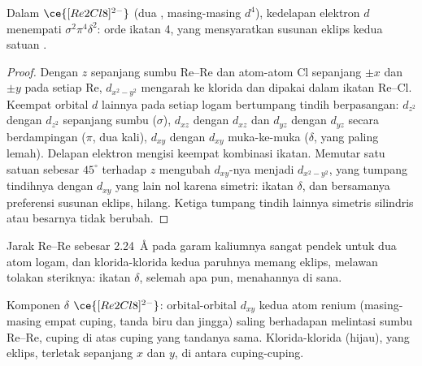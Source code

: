 \begin{proposition}\label{prop:b3:organometallic-bonding:quadruple}
Dalam $\ce{[Re2Cl8]^{2-}}$ (dua , masing-masing $d^4$), kedelapan elektron $d$ menempati $\sigma^2\pi^4\delta^2$: orde
ikatan 4, yang mensyaratkan susunan eklips kedua satuan .
\end{proposition}

\begin{proof}
Dengan $z$ sepanjang sumbu Re--Re dan atom-atom Cl sepanjang $\pm x$ dan $\pm y$ pada setiap Re, $d_{x^2-y^2}$
mengarah ke klorida dan dipakai dalam ikatan Re--Cl. Keempat orbital $d$ lainnya
pada setiap logam bertumpang tindih berpasangan: $d_{z^2}$ dengan $d_{z^2}$ sepanjang sumbu ($\sigma$), $d_{xz}$ dengan $d_{xz}$ dan $d_{yz}$
dengan $d_{yz}$ secara berdampingan ($\pi$, dua kali), $d_{xy}$ dengan $d_{xy}$ muka-ke-muka ($\delta$, yang paling lemah).
Delapan elektron mengisi keempat kombinasi ikatan. Memutar satu satuan sebesar $45^\circ$
terhadap $z$ mengubah $d_{xy}$-nya menjadi $d_{x^2-y^2}$, yang tumpang tindihnya dengan $d_{xy}$ yang lain nol karena
simetri: ikatan $\delta$, dan bersamanya preferensi susunan eklips, hilang. Ketiga
tumpang tindih lainnya simetris silindris atau besarnya tidak berubah.
\end{proof}

Jarak Re--Re sebesar \qty{2.24}{\angstrom} pada garam kaliumnya sangat pendek untuk dua atom logam, dan klorida-klorida kedua paruhnya memang eklips, melawan
tolakan steriknya: ikatan $\delta$, selemah apa pun, menahannya di sana.

\begin{omfigure}

{\small Komponen $\delta$  $\ce{[Re2Cl8]^{2-}}$: orbital-orbital $d_{xy}$
kedua atom renium (masing-masing empat cuping, tanda biru dan jingga) saling berhadapan
melintasi sumbu Re--Re, cuping di atas cuping yang tandanya sama. Klorida-klorida (hijau),
yang eklips, terletak sepanjang $x$ dan $y$, di antara cuping-cuping.}
\end{omfigure}

